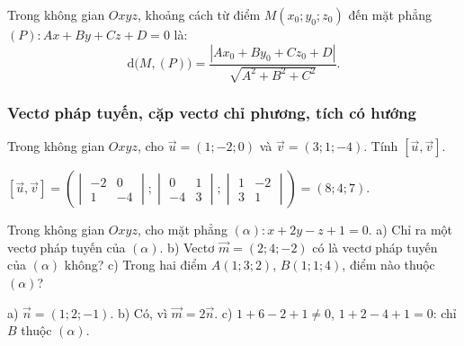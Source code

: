 \begin{congthuc}
\begin{minipage}[c]{.62\linewidth}
Trong không gian $Oxyz$, khoảng cách từ điểm $M(x_0;y_0;z_0)$ đến mặt phẳng $(P)\colon Ax+By+Cz+D=0$ là:
\[\mathrm d\big(M,(P)\big)=\frac{|Ax_0+By_0+Cz_0+D|}{\sqrt{A^2+B^2+C^2}}.\]
\end{minipage}\hfill
\begin{minipage}[c]{.35\linewidth}\centering
{}
\end{minipage}
\end{congthuc}

\viduminhhoa
\subsubsection{Vectơ pháp tuyến, cặp vectơ chỉ phương, tích có hướng}
\begin{vidu}
Trong không gian $Oxyz$, cho $\vec u=(1;-2;0)$ và $\vec v=(3;1;-4)$. Tính $[\vec u,\vec v]$.
\begin{loigiai}
$[\vec u,\vec v]=\left(\begin{vmatrix}-2&0\\1&-4\end{vmatrix};\begin{vmatrix}0&1\\-4&3\end{vmatrix};\begin{vmatrix}1&-2\\3&1\end{vmatrix}\right)=(8;4;7)$.
\end{loigiai}
\end{vidu}

\begin{vidu}
Trong không gian $Oxyz$, cho mặt phẳng $(\alpha)\colon x+2y-z+1=0$. a) Chỉ ra một vectơ pháp tuyến của $(\alpha)$. b) Vectơ $\vec m=(2;4;-2)$ có là vectơ pháp tuyến của $(\alpha)$ không? c) Trong hai điểm $A(1;3;2)$, $B(1;1;4)$, điểm nào thuộc $(\alpha)$?
\begin{loigiai}
a) $\vec n=(1;2;-1)$. b) Có, vì $\vec m=2\vec n$. c) $1+6-2+1\ne0$, $1+2-4+1=0$: chỉ $B$ thuộc $(\alpha)$.
\end{loigiai}
\end{vidu}

